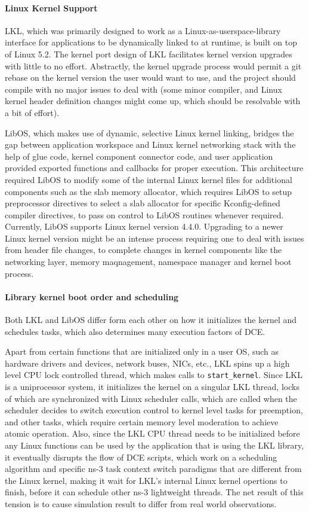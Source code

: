 \documentclass{sig-alternate}
\begin{document}
\paragraph{Linux Kernel Support}
LKL, which was primarily designed to work as a Linux-as-userspace-library interface for applications to be dynamically linked to at runtime, is built on top of 
Linux 5.2. The kernel port design of LKL facilitates kernel version upgrades with little to no effort. Abstractly, the kernel upgrade process 
would permit a git rebase on the kernel version the user would want to use, and the project should compile with no major issues to deal with (some minor compiler, 
and Linux kernel header definition changes might come up, which should be resolvable with a bit of effort).

LibOS, which makes use of dynamic, selective Linux kernel linking, bridges the gap between application workspace and Linux kernel networking stack with
the help of glue code, kernel component connector code, and user application provided exported functions and callbacks for proper execution. This
architecture required LibOS to modify some of the internal Linux kernel files for additional components such as the slab memory allocator, which requires 
LibOS to setup preprocessor directives to select a slab allocator for specific Kconfig-defined compiler directives, to pass on control to LibOS routines 
whenever required. Currently, LibOS supports Linux kernel version 4.4.0. Upgrading to a newer Linux kernel version might be an intense process requiring one 
to deal with issues from header file changes, to complete changes in kernel components like the networking layer, memory maqnagement, namespace manager 
and kernel boot process.


\paragraph{Library kernel boot order and scheduling}
Both LKL and LibOS differ form each other on how it initializes the kernel and schedules tasks, which also determines many execution factors of DCE. 

Apart from certain functions that are initialized only in a user OS, such as hardware drivers and devices, network buses, NICs, etc., LKL spins up a high level CPU lock controlled thread, which makes calls to 
\texttt{start\_kernel}. Since LKL is a uniprocessor system, it initializes the kernel on a singular LKL thread, locks of 
which are synchronized with Linux scheduler calls, which are called when the scheduler decides to switch execution control 
to kernel level tasks for preemption, and other tasks, which require certain memory level moderation to achieve
atomic operation. Also, since the LKL CPU thread needs to be initialized before any Linux functions can be used by the 
application that is using the LKL library, it eventually disrupts the flow of DCE scripts, which work on a 
scheduling algorithm and specific ns-3 task context switch paradigms that are different from the Linux kernel,
making it wait for LKL's internal Linux kernel opertions to finish, before it can schedule other ns-3 lightweight
threads.  The net result of this tension is to cause simulation result to differ from real world observations.
\end{document}

